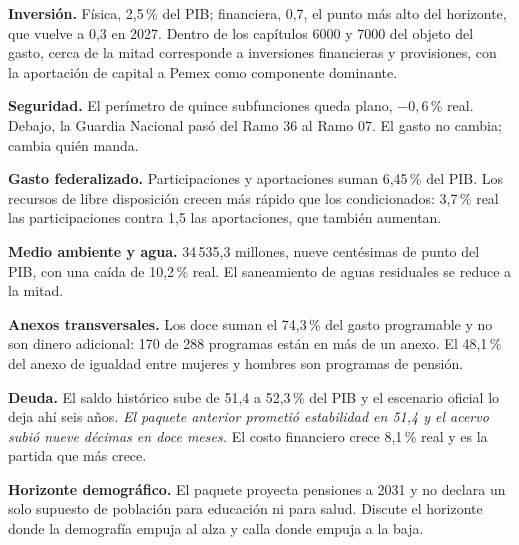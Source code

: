\textbf{Inversión.} Física, 2,5\,\% del PIB; financiera, 0,7, el punto más alto del horizonte,
que vuelve a 0,3 en 2027. Dentro de los capítulos 6000 y 7000 del objeto del gasto,
cerca de la mitad corresponde a inversiones financieras y provisiones, con la aportación de
capital a Pemex como componente dominante.

\textbf{Seguridad.} El perímetro de quince subfunciones queda plano, $-0,6$\,\% real. Debajo,
la Guardia Nacional pasó del Ramo 36 al Ramo 07. El gasto no cambia; cambia quién manda.

\textbf{Gasto federalizado.} Participaciones y aportaciones suman 6,45\,\% del PIB. Los
recursos de libre disposición crecen más rápido que los condicionados: 3,7\,\% real las
participaciones contra 1,5 las aportaciones, que también aumentan.

\textbf{Medio ambiente y agua.} 34\,535,3 millones, nueve centésimas de punto del PIB, con una
caída de 10,2\,\% real. El saneamiento de aguas residuales se reduce a la mitad.

\textbf{Anexos transversales.} Los doce suman el 74,3\,\% del gasto programable y no son
dinero adicional: 170 de 288 programas están en más de un anexo. El 48,1\,\% del anexo de
igualdad entre mujeres y hombres son programas de pensión.

\textbf{Deuda.} El saldo histórico sube de 51,4 a 52,3\,\% del PIB y el escenario oficial lo
deja ahí seis años. \emph{El paquete anterior prometió estabilidad en 51,4 y el acervo subió
nueve décimas en doce meses.} El costo financiero crece 8,1\,\% real y es la partida que más
crece.

\textbf{Horizonte demográfico.} El paquete proyecta pensiones a 2031 y no declara un solo
supuesto de población para educación ni para salud. Discute el horizonte donde la demografía
empuja al alza y calla donde empuja a la baja.
\clearpage
